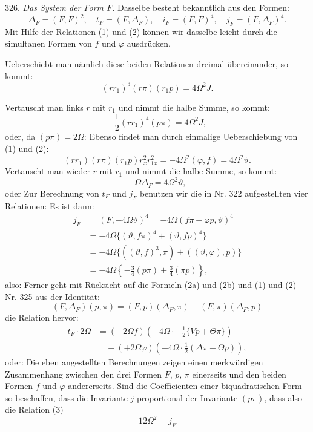 326. \textit{Das System der Form $F$.} Dasselbe besteht bekanntlich aus
den Formen:
\[
\Delta_F=(F,F)^2,\quad t_F=(F,\Delta_F),\quad i_F=(F,F)^4,\quad j_F=(F,\Delta_F)^4.
\]
Mit Hilfe der Relationen (1) und (2) können wir dasselbe leicht durch
die simultanen Formen von $f$ und $\varphi$ ausdrücken.

Ueberschiebt man nämlich diese beiden Relationen dreimal übereinander,
so kommt:
\[
(rr_1)^3(r\pi)(r_1p)=4\Omega^2J.
\]


Vertauscht man links $r$ mit $r_1$ und nimmt die halbe Summe, so kommt:
\[
-\frac{1}{2}(rr_1)^4(p\pi) = 4\Omega^2J,
\]
oder, da $(p\pi)=2\Omega$:
Ebenso findet man durch einmalige Ueberschiebung von (1) und (2):
\[
(rr_1)(r\pi)(r_1p)r_x^2r_{1x}^2 = -4\Omega^2(\varphi,f) = 4\Omega^2\vartheta.
\]
Vertauscht man wieder $r$ mit $r_1$ und nimmt die halbe Summe, so kommt:
\[
-\Omega\Delta_F = 4\Omega^2\vartheta,
\]
oder
Zur Berechnung von $t_F$ und $j_F$ benutzen wir die in Nr. 322 aufgestellten vier Relationen:
Es ist dann:
\[
\begin{aligned}
j_F &= (F,-4\Omega\vartheta)^4 = -4\Omega(f\pi+\varphi p,\vartheta)^4\\
&= -4\Omega\{(\vartheta,f\pi)^4+(\vartheta,fp)^4\}\\
&= -4\Omega\{((\vartheta,f)^3,\pi)+((\vartheta,\varphi),p)\}\\
&= -4\Omega\left\{-\frac{3}{4}(p\pi)+\frac{3}{4}(\pi p)\right\},
\end{aligned}
\]
also:
Ferner geht mit R\"ucksicht auf die Formeln (2a) und (2b) und (1) und (2) Nr. 325 aus der Identit\"at:
\[
(F,\Delta_F)(p,\pi) = (F,p)(\Delta_F,\pi) - (F,\pi)(\Delta_F,p)
\]
die Relation hervor:
\[
\begin{aligned}
t_F\cdot 2\Omega &= (-2\Omega f)\left(-4\Omega\cdot-\frac{1}{2}\{Vp+\Theta\pi\}\right)\\
&\quad -(+2\Omega\varphi)\left(-4\Omega\cdot\frac{1}{2}(\Delta\pi+\Theta p)\right),
\end{aligned}
\]
oder:
Die eben angestellten Berechnungen zeigen einen merkw\"urdigen Zusammenhang zwischen den drei Formen $F$, $p$, $\pi$ einerseits und den beiden Formen $f$ und $\varphi$ andererseits. Sind die Co\"efficienten einer biquadratischen Form so beschaffen, dass die Invariante $j$ proportional der Invariante $(p\pi)$, dass also die Relation (3)
\[
12\Omega^2 = j_F
\]


